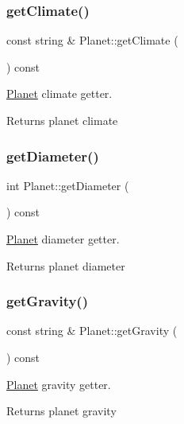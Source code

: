 \subsubsection{\texorpdfstring{get\+Climate()}{getClimate()}}
{\footnotesize\ttfamily const string \& Planet\+::get\+Climate (\begin{DoxyParamCaption}{ }\end{DoxyParamCaption}) const}



\hyperlink{class_planet}{Planet} climate getter. 

\begin{DoxyReturn}{Returns}
planet climate 
\end{DoxyReturn}
\mbox{\label{class_planet_a07e8d450fcdb6041c76b6ea3658c1f4b}} 
\subsubsection{\texorpdfstring{get\+Diameter()}{getDiameter()}}
{\footnotesize\ttfamily int Planet\+::get\+Diameter (\begin{DoxyParamCaption}{ }\end{DoxyParamCaption}) const}



\hyperlink{class_planet}{Planet} diameter getter. 

\begin{DoxyReturn}{Returns}
planet diameter 
\end{DoxyReturn}
\mbox{\label{class_planet_ac5a05abfcc0f5dfd23b2787711d7d0e0}} 
\subsubsection{\texorpdfstring{get\+Gravity()}{getGravity()}}
{\footnotesize\ttfamily const string \& Planet\+::get\+Gravity (\begin{DoxyParamCaption}{ }\end{DoxyParamCaption}) const}



\hyperlink{class_planet}{Planet} gravity getter. 

\begin{DoxyReturn}{Returns}
planet gravity 
\end{DoxyReturn}
\mbox{\label{class_planet_a6eefeb72d53a878ba3f7b890c50ecdaa}} 

